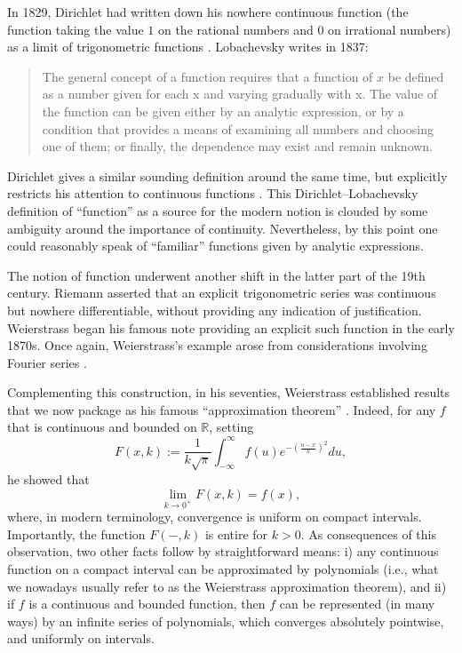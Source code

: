\documentclass[11pt,leqno]{article}
\newcommand{\real}{{\mathbb R}}
\renewcommand{\1}{{\rm 1\hspace*{-0.4ex}%
\rule{0.1ex}{1.52ex}\hspace*{0.2ex}}}
\newcommand{\<}[1]{{\langle}#1 {\rangle}}
\theoremstyle{plain}
\theoremstyle{definition}
\theoremstyle{remark}
\numberwithin{equation}{subsection}
\begin{document}
In 1829, Dirichlet had written down his nowhere continuous function (the function taking the value $1$ on the rational numbers and $0$ on irrational numbers) as a limit of trigonometric functions \cite[p. 169]{dirichlet1829convergence}.   Lobachevsky writes in 1837:
\begin{quote}
	The general concept of a function requires that a function of $x$ be defined as a number given for each x and varying gradually with x. The value of the function can be given either by an analytic expression, or by a condition that provides a means of examining all numbers and choosing one of them; or finally, the dependence may exist and remain unknown.  
\end{quote}
Dirichlet gives a similar sounding definition around the same time, but explicitly restricts his attention to continuous functions \cite[\S 2.8]{medvedev1991scenes}.  This Dirichlet--Lobachevsky definition of ``function'' as a source for the modern notion is clouded by some ambiguity around the importance of continuity.  Nevertheless, by this point one could reasonably speak of ``familiar'' functions given by analytic expressions.

The notion of function underwent another shift in the latter part of the 19th century.  Riemann asserted that an explicit trigonometric series was continuous but nowhere differentiable, without providing any indication of justification.  Weierstrass began his famous note providing an explicit such function in the early 1870s.  Once again, Weierstrass's example arose from considerations involving Fourier series \cite{Weierstrass1895Continuous}.  

Complementing this construction, in his seventies, Weierstrass established results that we now package as his famous ``approximation theorem'' \cite{Weierstrass1885AnalytischeDarstellbarkeit}.  Indeed, for any $f$ that is continuous and bounded on $\real$, setting
\[ 	
F(x,k) := \frac{1}{k \sqrt{\pi}} \int_{-\infty}^{\infty} f(u) e^{-(\frac{u-x}{k})^2} du, 
\]
he showed that
\[
\lim_{k \to 0^+} F(x,k) = f(x),
\]
where, in modern terminology, convergence is uniform on compact intervals.  Importantly, the function $F(-,k)$ is entire for $k > 0$.  As consequences of this observation, two other facts follow by straightforward means: i) any continuous function on a compact interval can be approximated by polynomials (i.e., what we nowadays usually refer to as the Weierstrass approximation theorem), and ii) if $f$ is a continuous and bounded function, then $f$ can be represented (in many ways) by an infinite series of polynomials, which converges absolutely pointwise, and uniformly on intervals.  
\end{document}
